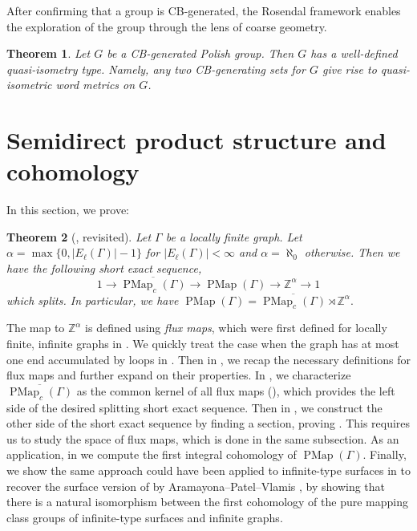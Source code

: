 \documentclass[11pt]{amsart}
\theoremstyle{plain}
\newtheorem{THM}{Theorem}[section]
\theoremstyle{definition}
\DeclareMathOperator{\PMap}{PMap}
\newcommand{\Z}{\mathbb{Z}}
\def\G{{\Gamma}}
\newcommand{\<}{\langle}
\renewcommand{\>}{\rangle}
\newcommand{\longto}{\longrightarrow}
\begin{document}
After confirming that a group is CB-generated, the Rosendal framework enables the exploration of the group through the lens of coarse geometry.

\begin{THM}\cite[Theorem 1.2, Proposition 2.72]{rosendal2022}
    Let $G$ be a CB-generated Polish group. Then $G$ has a well-defined quasi-isometry type. Namely, any two CB-generating sets for $G$ give rise to quasi-isometric word metrics on $G$.
\end{THM}

\section{Semidirect product structure and cohomology} \label{sec:semidirect}

In this section, we prove:

\begin{THM}[, revisited]
\label{thm:semidirectprod_revisited}
Let $\G$ be a locally finite graph.
Let $\alpha = \max\{0,|E_\ell(\G)| - 1\}$ for $|E_\ell(\G)|<\infty$ and $\alpha = \aleph_0$ otherwise. Then we have the following short exact sequence,
\[
    1 \longto \overline{\PMap_c(\G)} \longto \PMap(\G) \longto \Z^\alpha \longto 1
\]
which splits. In particular, we have $\PMap(\G)=\overline{\PMap_c(\G)} \rtimes \Z^{\alpha}.$
\end{THM}

The map to $\Z^{\alpha}$ is defined using \emph{flux maps}, which were first defined for locally finite, infinite graphs in \cite{DHK2023}. We quickly treat the case when the graph has at most one end accumulated by loops in . Then in , we recap the necessary definitions for flux maps and further expand on their properties. In , we characterize $\overline{\PMap_c(\G)}$ as the common kernel of all flux maps (), which provides the left side of the desired splitting short exact sequence. Then in , we construct the other side of the short exact sequence by finding a section, proving . This requires us to study the space of flux maps, which is done in the same subsection. As an application, in  we compute the first integral cohomology of $\PMap(\G)$. Finally, we show the same approach could have been applied to infinite-type surfaces in  to recover the surface version of  by Aramayona--Patel--Vlamis \cite{APV2020}, by showing that there is a natural isomorphism between the first cohomology of the pure mapping class groups of infinite-type surfaces and infinite graphs.
\end{document}
